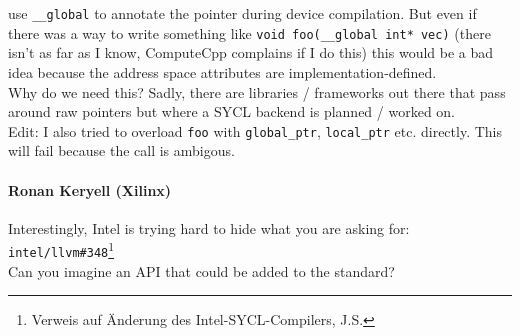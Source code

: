 \begin{otherlanguage}{english}
                            use \texttt{\_\_global} to annotate the pointer
                            during device compilation. But even if there was a
                            way to write something like
                            \texttt{void foo(\_\_global int* vec)} (there isn't
                            as far as I know, ComputeCpp complains if I do this)
                            this would be a bad idea because the address space
                            attributes are implementation-defined.
                            \\
                            Why do we need this? Sadly, there are libraries /
                            frameworks out there that pass around raw pointers
                            but where a SYCL backend is planned / worked on.
                            \\
                            Edit: I also tried to overload \texttt{foo} with
                            \texttt{global\_ptr}, \texttt{local\_ptr} etc.
                            directly. This will fail because the call is
                            ambigous.
    \paragraph{Ronan Keryell (Xilinx)} Interestingly, Intel is trying hard to
                                       hide what you are asking for:
                                       \texttt{intel/llvm\#348}\footnote{Verweis
                                       auf Änderung des Intel-SYCL-Compilers, 
                                       J.S.}
                                       \\
                                       Can you imagine an API that could be
                                       added to the standard?

\end{otherlanguage}
